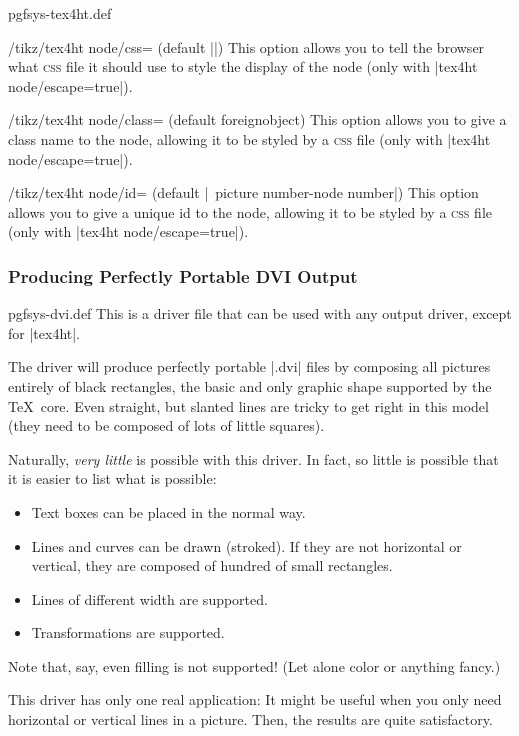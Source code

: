 \begin{filedescription}{pgfsys-tex4ht.def}
  \begin{key}{/tikz/tex4ht node/css=  (default |\string\jobname|)}
    This option allows you to tell the browser what \textsc{css} file
    it should  use to style the display of the node (only with
    |tex4ht node/escape=true|). 
  \end{key}

  \begin{key}{/tikz/tex4ht node/class=  (default foreignobject)}
    This option allows you to give a class name to the node, allowing
    it to be styled by a \textsc{css} file (only with
    |tex4ht node/escape=true|). 
  \end{key}

  \begin{key}{/tikz/tex4ht node/id= (default
      |\string\jobname\ picture number-node number|)} 
    This option allows you to give a unique id to the node, allowing
    it to be styled by a \textsc{css} file (only with
    |tex4ht  node/escape=true|). 
  \end{key}
\end{filedescription}


\subsubsection{Producing Perfectly Portable DVI Output}

\begin{filedescription}{pgfsys-dvi.def}
  This is a driver file that can be used with any output driver,
  except for |tex4ht|.

  The driver will produce perfectly portable |.dvi| files by composing
  all pictures entirely of black rectangles, the basic and only graphic
  shape supported by the \TeX\ core. Even straight, but slanted lines
  are tricky to get right in this model (they need to be composed of
  lots of little squares).

  Naturally, \emph{very little} is possible with this driver. In fact,
  so little is possible that it is easier to list what is possible:
  \begin{itemize}
  \item Text boxes can be placed in the normal way.
  \item Lines and curves can be drawn (stroked). If they are not
    horizontal or vertical, they are composed of hundred of small
    rectangles.
  \item Lines of different width are supported.
  \item Transformations are supported.
  \end{itemize}
  Note that, say, even filling is not supported! (Let alone color or
  anything fancy.)

  This driver has only one real application: It might be useful when
  you only need horizontal or vertical lines in a picture. Then, the
  results are quite satisfactory.
\end{filedescription}

